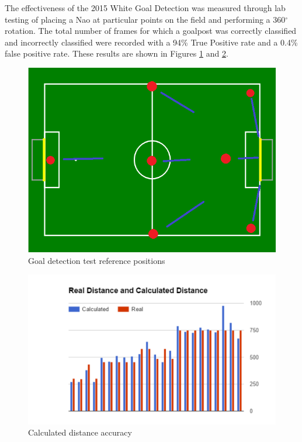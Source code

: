 \documentclass[runningheads,a4paper]{llncs}
\begin{document}
The effectiveness of the 2015 White Goal Detection was measured through lab testing of placing a Nao at particular points on the field and performing a 360$^{\circ}$  rotation. The total number of frames for which a goalpost was correctly classified and incorrectly classified were recorded with a 94\% True Positive rate and a 0.4\% false positive rate. These results are shown in Figures \ref{fig:testpos} and \ref{fig:distaccuracy}.

\begin{figure}[!ht]
\includegraphics[scale=0.3]{Figures/testpos}
\caption{Goal detection test reference positions}\label{fig:testpos}
\end{figure}
\begin{figure} [h]
\includegraphics[scale=0.7]{Figures/distaccuracy}
\caption{Calculated distance accuracy}\label{fig:distaccuracy}
\end{figure}
\end{document}
